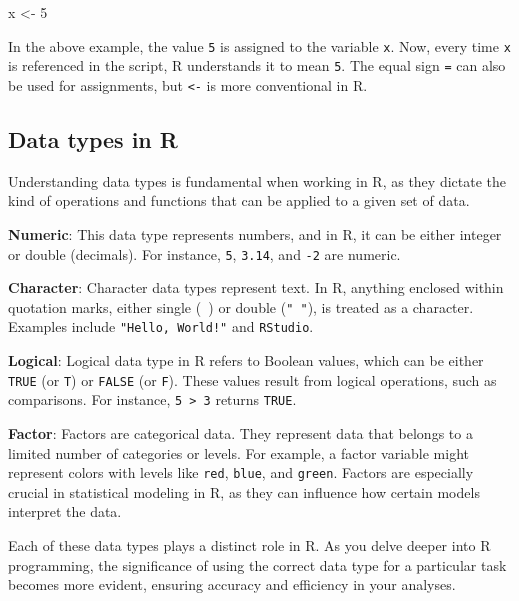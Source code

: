 \documentclass[
  b5paper]{book}
\newenvironment{Shaded}{\begin{snugshade}}{\end{snugshade}}
\newcommand{\DecValTok}[1]{\textcolor[rgb]{0.00,0.00,0.81}{#1}}
\newcommand{\NormalTok}[1]{#1}
\newcommand{\OtherTok}[1]{\textcolor[rgb]{0.56,0.35,0.01}{#1}}
\begin{document}
\begin{Shaded}
\begin{Highlighting}[]
\NormalTok{x }\OtherTok{\textless{}{-}} \DecValTok{5}
\end{Highlighting}
\end{Shaded}

In the above example, the value \texttt{5} is assigned to the variable \texttt{x}. Now, every time \texttt{x} is referenced in the script, R understands it to mean \texttt{5}. The equal sign \texttt{=} can also be used for assignments, but \texttt{\textless{}-} is more conventional in R.

\hypertarget{data-types-in-r}{%
\subsection*{Data types in R}\label{data-types-in-r}}

Understanding data types is fundamental when working in R, as they dictate the kind of operations and functions that can be applied to a given set of data.

\textbf{Numeric}: This data type represents numbers, and in R, it can be either integer or double (decimals). For instance, \texttt{5}, \texttt{3.14}, and \texttt{-2} are numeric.

\textbf{Character}: Character data types represent text. In R, anything enclosed within quotation marks, either single (\texttt{\textquotesingle{}\ \textquotesingle{}}) or double (\texttt{"\ "}), is treated as a character. Examples include \texttt{"Hello,\ World!"} and \texttt{\textquotesingle{}RStudio\textquotesingle{}}.

\textbf{Logical}: Logical data type in R refers to Boolean values, which can be either \texttt{TRUE} (or \texttt{T}) or \texttt{FALSE} (or \texttt{F}). These values result from logical operations, such as comparisons. For instance, \texttt{5\ \textgreater{}\ 3} returns \texttt{TRUE}.

\textbf{Factor}: Factors are categorical data. They represent data that belongs to a limited number of categories or levels. For example, a factor variable might represent colors with levels like \texttt{red}, \texttt{blue}, and \texttt{green}. Factors are especially crucial in statistical modeling in R, as they can influence how certain models interpret the data.

Each of these data types plays a distinct role in R. As you delve deeper into R programming, the significance of using the correct data type for a particular task becomes more evident, ensuring accuracy and efficiency in your analyses.
\end{document}
